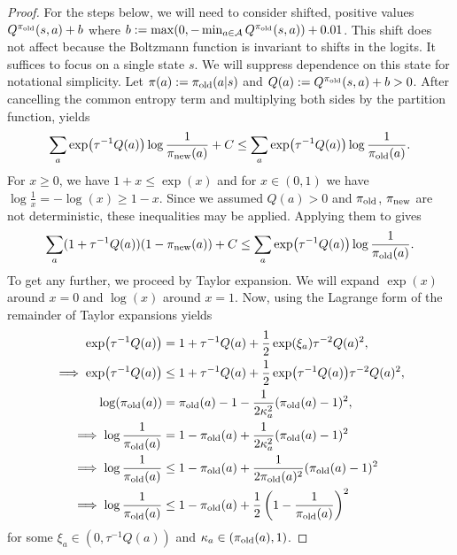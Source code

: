 \documentclass[\main/thesis.tex]{subfiles}
\begin{document}
\begin{proof}

For the steps below, we will need to consider shifted, positive values $Q^{{\pi_\mathrm{old}}}(s, a) + b $ where $b := \max(0, -\min_{a \in \mathcal{A}} Q^{{\pi_\mathrm{old}}}(s,a)) + 0.01$. This shift does not affect  because the Boltzmann function is invariant to shifts in the logits. 
It suffices to focus on a single state $s$. We will suppress dependence on this state for notational simplicity. Let $\pi(a) := {\pi_\mathrm{old}}(a | s)$ and $Q(a) := Q^{{\pi_\mathrm{old}}}(s, a) + b > 0$. After cancelling the common entropy term and multiplying both sides by the partition function,  yields
\begin{align}\label{eq:first-ineq}
    \sum_a \exp(\tau^{-1} Q(a)) \log \frac{1}{{\pi_\mathrm{new}}(a)} + C \leq \sum_a \exp(\tau^{-1} Q(a)) \log \frac{1}{{\pi_\mathrm{old}}(a)}.
\end{align}
For $x \geq 0$, we have $1 + x \leq \exp(x)$ and for $x \in (0, 1)$ we have $ \log \frac{1}{x} = -\log(x) \geq 1 - x$. Since we assumed $Q(a) > 0$ and ${\pi_\mathrm{old}}$, ${\pi_\mathrm{new}}$ are not deterministic, these inequalities may be applied. Applying them to  gives
\begin{align}\label{eq:second-ineq}
    \sum_a (1 + \tau^{-1} Q(a)) (1 - {\pi_\mathrm{new}}(a)) + C \leq \sum_a \exp(\tau^{-1} Q(a)) \log\frac{1}{{\pi_\mathrm{old}}(a)}.
\end{align}
To get any further, we proceed by Taylor expansion. We will expand $\exp(x)$ around $x = 0$ and $\log (x)$ around $x = 1$. Now, using the Lagrange form of the remainder of Taylor expansions yields
\begin{align*}
    \exp(\tau^{-1} Q(a)) &= 1 + \tau^{-1} Q(a) + \frac{1}{2}\exp(\xi_a) \tau^{-2} Q(a)^2,\\
    \implies \exp(\tau^{-1} Q(a)) &\leq 1 + \tau^{-1} Q(a) + \frac{1}{2}\exp(\tau^{-1} Q(a)) \tau^{-2} Q(a)^2,\\
    \log({\pi_\mathrm{old}}(a)) &= {\pi_\mathrm{old}}(a) - 1 - \frac{1}{2\kappa_a^2} ({\pi_\mathrm{old}}(a) - 1)^2,\\
    \implies \log \frac{1}{{\pi_\mathrm{old}}(a)} &= 1 - {\pi_\mathrm{old}}(a) + \frac{1}{2\kappa_a^2} ({\pi_\mathrm{old}}(a) - 1)^2\\
    \implies \log \frac{1}{{\pi_\mathrm{old}}(a)} &\leq 1 - {\pi_\mathrm{old}}(a) + \frac{1}{2{\pi_\mathrm{old}}(a)^2} ({\pi_\mathrm{old}}(a) - 1)^2\\
    \implies \log \frac{1}{{\pi_\mathrm{old}}(a)} &\leq 1 - {\pi_\mathrm{old}}(a) + \frac{1}{2} \left(1 - \frac{1}{{\pi_\mathrm{old}}(a)}\right)^2
\end{align*}
for some $\xi_a \in (0, \tau^{-1}Q(a))$ and $\kappa_a \in ({\pi_\mathrm{old}}(a), 1)$. 

\end{proof}
\end{document}
